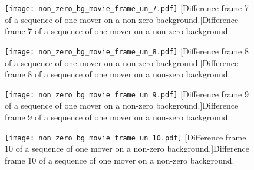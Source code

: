 \clearpage

\begin{figure}[!ht]
	\centering
	\texttt{[image: non\_zero\_bg\_movie\_frame\_un\_7.pdf]}
	[Difference frame 7 of a sequence of one mover on a non-zero background.]{Difference frame 7 of a sequence of one mover on a non-zero background.}
	\label{fig:non_zero_bg_movie_frame_un_7}
\end{figure}

\begin{figure}[!ht]
	\centering
	\texttt{[image: non\_zero\_bg\_movie\_frame\_un\_8.pdf]}
	[Difference frame 8 of a sequence of one mover on a non-zero background.]{Difference frame 8 of a sequence of one mover on a non-zero background.}
	\label{fig:non_zero_bg_movie_frame_un_8}
\end{figure}

\begin{figure}[!ht]
	\centering
	\texttt{[image: non\_zero\_bg\_movie\_frame\_un\_9.pdf]}
	[Difference frame 9 of a sequence of one mover on a non-zero background.]{Difference frame 9 of a sequence of one mover on a non-zero background.}
	\label{fig:non_zero_bg_movie_frame_un_9}
\end{figure}

\clearpage

\begin{figure}[!ht]
	\centering
	\texttt{[image: non\_zero\_bg\_movie\_frame\_un\_10.pdf]}
	[Difference frame 10 of a sequence of one mover on a non-zero background.]{Difference frame 10 of a sequence of one mover on a non-zero background.}
	\label{fig:non_zero_bg_movie_frame_un_10}
\end{figure}


